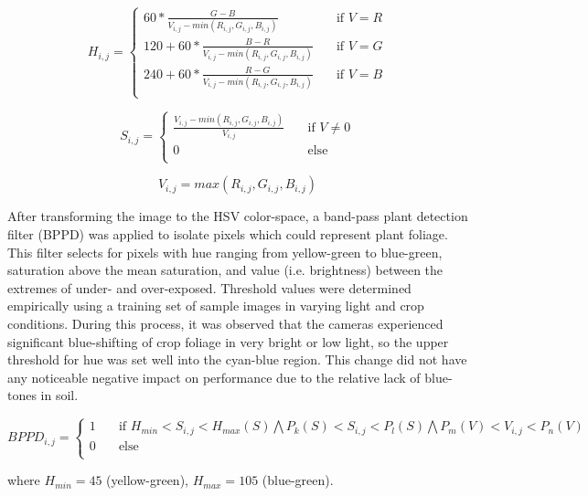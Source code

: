 \begin{equation}
  H_{i,j} =
  \begin{cases}
    60 * \frac{G-B}{V_{i,j}-min(R_{i,j},G_{i,j},B_{i,j})}  & \quad \text{if } V = R \\
    120 + 60 * \frac{B-R}{V_{i,j}-min(R_{i,j},G_{i,j},B_{i,j})}  & \quad \text{if } V = G \\
    240 + 60 * \frac{R-G}{V_{i,j}-min(R_{i,j},G_{i,j},B_{i,j})}  & \quad \text{if } V = B \\
  \end{cases}
  \label{eq:rgb2h}
\end{equation}

\begin{equation}
  S_{i,j} = 
  \begin{cases}
    \frac{V_{i,j}-min(R_{i,j},G_{i,j},B_{i,j})}{V_{i,j}}  & \quad \text{if } V \neq 0 \\
    0  & \quad \text{else}\\
  \end{cases}
  \label{eq:rgb2s}
\end{equation}

\begin{equation}
  V_{i,j} = max(R_{i,j},G_{i,j},B_{i,j})
  \label{eq:rgb2v}
\end{equation}

After transforming the image to the HSV color-space, a band-pass plant
detection filter (BPPD) was applied to isolate pixels which could
represent plant foliage. This filter selects for pixels with hue
ranging from yellow-green to blue-green, saturation above the mean
saturation, and value (i.e. brightness) between the extremes of under-
and over-exposed. Threshold values were determined empirically using a
training set of sample images in varying light and crop
conditions. During this process, it was observed that the cameras
experienced significant blue-shifting of crop foliage in very bright
or low light, so the upper threshold for hue was set well into the
cyan-blue region. This change did not have any noticeable negative
impact on performance due to the relative lack of blue-tones in soil.

\begin{equation}
BPPD_{i,j} =
  \begin{cases}
    1  & \quad \text{if } H_{min}< S_{i,j} <H_{max}(S) \bigwedge P_{k}(S)< S_{i,j} <P_{l}(S) \bigwedge P_{m}(V)< V_{i,j} <P_{n}(V)\text{ }\\
    0  & \quad \text{else}\\
  \end{cases}
  \label{eq:bppd}
\end{equation}
\begin{flushleft}
where $H_{min}=45$ (yellow-green), $H_{max}=105$ (blue-green).
\end{flushleft}

